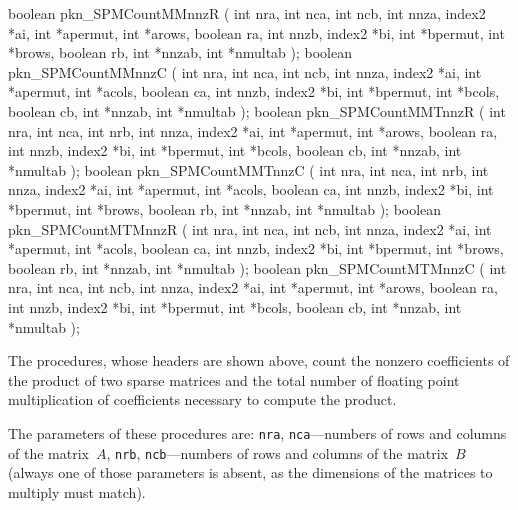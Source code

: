 \newpage
\begin{listingC}
boolean pkn_SPMCountMMnnzR ( int nra, int nca, int ncb,
                               int nnza, index2 *ai,
                               int *apermut, int *arows, boolean ra,
                               int nnzb, index2 *bi,
                               int *bpermut, int *brows, boolean rb,
                               int *nnzab, int *nmultab );
boolean pkn_SPMCountMMnnzC ( int nra, int nca, int ncb,
                               int nnza, index2 *ai,
                               int *apermut, int *acols, boolean ca,
                               int nnzb, index2 *bi,
                               int *bpermut, int *bcols, boolean cb,
                               int *nnzab, int *nmultab );
boolean pkn_SPMCountMMTnnzR ( int nra, int nca, int nrb,
                              int nnza, index2 *ai,
                              int *apermut, int *arows, boolean ra,
                              int nnzb, index2 *bi,
                              int *bpermut, int *bcols, boolean cb,
                              int *nnzab, int *nmultab );
boolean pkn_SPMCountMMTnnzC ( int nra, int nca, int nrb,
                              int nnza, index2 *ai,
                              int *apermut, int *acols, boolean ca,
                              int nnzb, index2 *bi,
                              int *bpermut, int *brows, boolean rb,
                              int *nnzab, int *nmultab );
boolean pkn_SPMCountMTMnnzR ( int nra, int nca, int ncb,
                              int nnza, index2 *ai,
                              int *apermut, int *acols, boolean ca,
                              int nnzb, index2 *bi,
                              int *bpermut, int *brows, boolean rb,
                              int *nnzab, int *nmultab );
boolean pkn_SPMCountMTMnnzC ( int nra, int nca, int ncb,
                              int nnza, index2 *ai,
                              int *apermut, int *arows, boolean ra,
                              int nnzb, index2 *bi,
                              int *bpermut, int *bcols, boolean cb,
                              int *nnzab, int *nmultab );
\end{listingC}
The procedures, whose headers are shown above, count the nonzero
coefficients of the product of two sparse matrices and the total
number of floating point multiplication of coefficients necessary to compute
the product.

The parameters of these procedures are: \texttt{nra}, \texttt{nca}---numbers
of rows and columns of the matrix~$A$, \texttt{nrb}, \texttt{ncb}---numbers
of rows and columns of the matrix~$B$ (always one of those parameters is
absent, as the dimensions of the matrices to multiply must match).

